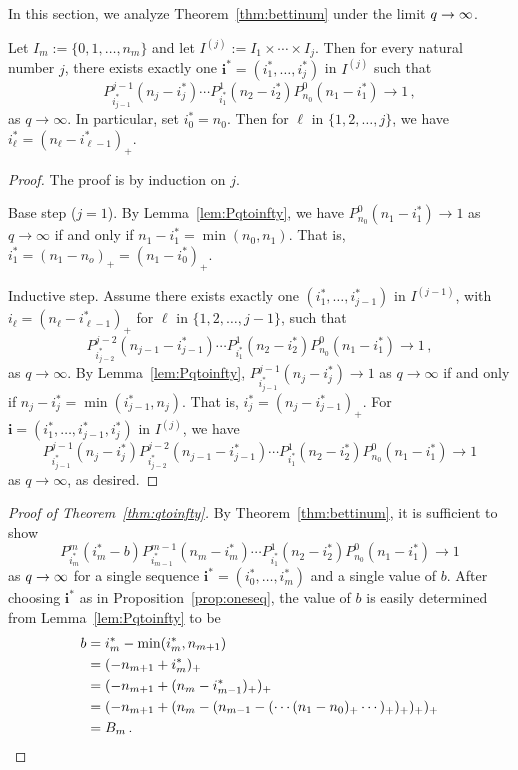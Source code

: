 In this section, we analyze Theorem~\ref{thm:bettinum} under the 
limit $q \rightarrow \infty$.

\begin{proposition}
  \label{prop:oneseq}
Let $I_m:= \{0,1,\ldots, n_m\}$ and let $I^{(j)}:= I_1\times\cdots \times I_j$.
Then for every natural number $j$, there exists exactly one $\mathbf{i}^\ast =
(i_1^\ast,\ldots, i_j^\ast)$ in $I^{(j)}$ such that 
\[
  P_{i_{j-1}^\ast}^{j-1}(n_j-i_j^\ast)\cdots
  P_{i_1^\ast}^1(n_2-i_2^\ast)P_{n_0}^0(n_1-i_1^\ast) \to 1 \, ,
\]
as $q\to\infty$. In particular, set $i_0^\ast = n_0$. Then for $\ell$ in
$\{1,2,\ldots, j\}$, we have $i_\ell^\ast = (n_\ell - i_{\ell - 1}^\ast)_+$.
\end{proposition}

\begin{proof}
The proof is by induction on $j$.

Base step ($j=1$). By Lemma~\ref{lem:Pqtoinfty}, we have $P_{n_0}^0 (n_1 -
i_1^\ast) \to 1$ as $q\to\infty$ if and only if $n_1 - i_1^\ast = \min(n_0,
n_1)$.  That is, $i_1^\ast = (n_1 - n_o)_+ = (n_1 - i_0^\ast)_+$.

Inductive step. Assume there exists exactly one $(i_1^\ast,\ldots ,
i_{j-1}^\ast)$ in $I^{(j-1)}$, with $i_\ell = (n_\ell - i_{\ell-1}^\ast)_+$ for
$\ell$ in $\{1,2,\ldots, j-1\}$, such that 
\[
P_{i_{j-2}^\ast}^{j-2}(n_{j-1} - i_{j-1}^\ast) %
\cdots P_{i_1^\ast}^1 (n_2 - i_2^\ast) P_{n_0}^0 (n_1 - i_1^\ast) \to 1 \, ,
\]
as $q\to\infty$.  By Lemma~\ref{lem:Pqtoinfty}, $P_{i_{j-1}^\ast}^{j-1}(n_j -
i_j^\ast) \to 1$ as $q \to \infty$ if and only if $n_j - i_j^\ast =
\min(i_{j-1}^\ast, n_j)$. That is, $i_j^\ast = (n_j - i_{j-1}^\ast)_+$.  
For $\mathbf{i} = (i_1^\ast,\ldots, i_{j-1}^\ast, i_j^\ast)$ in $I^{(j)}$, we
have
\[
P_{i_{j-1}^\ast}^{j-1}(n_j-i_j^\ast)P_{i_{j-2}^\ast}^{j-2}(n_{j-1}-i_{j-1}^\ast)\cdots P_{i_1^\ast}^1(n_2-i_2^\ast)P_{n_0}^0(n_1-i_1^\ast) \to 1
\]
as $q\to\infty$, as desired.
\end{proof}

\begin{proof}[Proof of Theorem~\ref{thm:qtoinfty}]
  By Theorem~\ref{thm:bettinum}, it is sufficient to show
  \[
    P^m_{i_m^\ast}(i_m^\ast-b) P_{i^\ast_{m-1}}^{m-1}\left(n_{m} -i_m^\ast\right) \cdots
    P_{i_1^\ast}^1\left(n_2 - i_2^\ast\right) P_{n_0}^0 \left(n_1 - i_1^\ast\right) \to 1 
  \]
  as $q \rightarrow \infty$ for a single sequence $\mathbf{i}^\ast=(i_0^\ast, \ldots,
  i_m^\ast)$ and a single
  value of $b$. After choosing $\mathbf{i}^\ast$ as in Proposition~\ref{prop:oneseq},
  the value of $b$ is easily determined from Lemma~\ref{lem:Pqtoinfty} to be
	\begin{align*}
	b 	&= i_m^\ast - \min(i_m^\ast, n_{m+1})\\
		&= (-n_{m+1} + i_m^\ast)_+\\
		&= (-n_{m+1} + (n_m -i_{m-1}^\ast)_+)_+\\
		&= (-n_{m+1} + (n_m - (n_{m-1} - (\cdots (n_1 - n_0)_+ \cdots)_+)_+)_+ )_+\\
        &= B_m \, . \qedhere
	\end{align*}
\end{proof}

